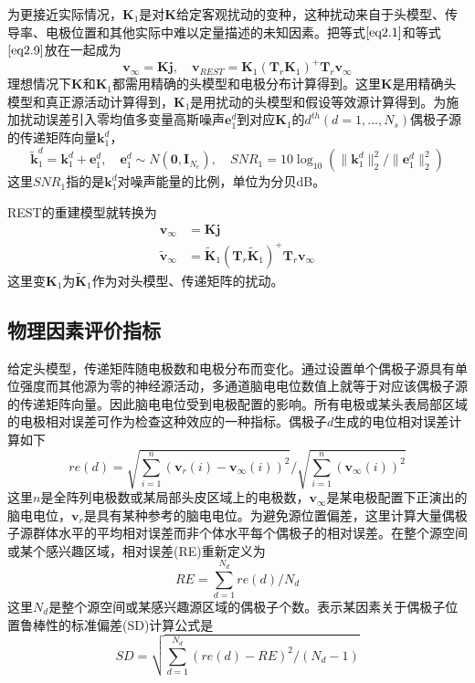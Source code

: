 为更接近实际情况，$\mathbf{K}_1$是对$\mathbf{K}$给定客观扰动的变种，这种扰动来自于头模型、传导率、电极位置和其他实际中难以定量描述的未知因素。把等式$\eqref{eq2.1}$和等式$\eqref{eq2.9}$放在一起成为
\begin{equation*}
\mathbf{v}_{\infty}=\mathbf{Kj},\quad\mathbf{v}_{REST}=\mathbf{K}_1(\mathbf{T}_r\mathbf{K}_1)^{+}\mathbf{T}_{r}\mathbf{v}_{\infty}
\end{equation*}
理想情况下$\mathbf{K}$和$\mathbf{K}_1$都需用精确的头模型和电极分布计算得到。这里$\mathbf{K}$是用精确头模型和真正源活动计算得到，$\mathbf{K}_1$是用扰动的头模型和假设等效源计算得到。为施加扰动误差引入零均值多变量高斯噪声$\mathbf{e}_1^d$到对应$\mathbf{K}_1$的$d^{th}(d=1,...,N_s)$偶极子源的传递矩阵向量$\mathbf{k}_1^d$，
\begin{equation*}
\tilde{\mathbf{k}}_1^d=\mathbf{k}_1^d+\mathbf{e}_1^d,\quad\mathbf{e}_1^d\sim{N(\mathbf{0},\mathbf{I}_{N_e})},\quad{SNR}_1 =10\log_{10}(\lVert\mathbf{k}_1^d\rVert_2^2/{\lVert\mathbf{e}_1^d\rVert_2^2})
\end{equation*}
这里$SNR_1$指的是$\mathbf{k}_1^d$对噪声能量的比例，单位为分贝dB。

REST的重建模型就转换为
\begin{equation}\label{eq2.10}
\begin{aligned}
\mathbf{v}_{\infty}& =\mathbf{Kj}\\
\tilde{\mathbf{v}}_{\infty}& =\tilde{\mathbf{K}}_1(\mathbf{T}_{r}\tilde{\mathbf{K}}_1)^+\mathbf{T}_r\mathbf{v}_{\infty}
\end{aligned}
\end{equation}
这里变$\mathbf{K}_1$为$\tilde{\mathbf{K}}_1$作为对头模型、传递矩阵的扰动。

\subsection{物理因素评价指标}
给定头模型，传递矩阵随电极数和电极分布而变化。通过设置单个偶极子源具有单位强度而其他源为零的神经源活动，多通道脑电电位数值上就等于对应该偶极子源的传递矩阵向量。因此脑电电位受到电极配置的影响。所有电极或某头表局部区域的电极相对误差可作为检查这种效应的一种指标。偶极子$d$生成的电位相对误差计算如下
\begin{equation*}
re(d)=\sqrt{\sum_{i=1}^n(\mathbf{v}_r(i)-\mathbf{v}_{\infty}(i))^2}/\sqrt{\sum_{i=1}^n(\mathbf{v}_{\infty}(i))^2}
\end{equation*}
这里$n$是全阵列电极数或某局部头皮区域上的电极数，$\mathbf{v}_{\infty}$是某电极配置下正演出的脑电电位，$\mathbf{v}_r$是具有某种参考的脑电电位。为避免源位置偏差，这里计算大量偶极子源群体水平的平均相对误差而非个体水平每个偶极子的相对误差。在整个源空间或某个感兴趣区域，相对误差(RE)重新定义为
\begin{equation*}
RE=\sum_{d=1}^{N_d}re(d)/{N_d}
\end{equation*}
这里$N_d$是整个源空间或某感兴趣源区域的偶极子个数。表示某因素关于偶极子位置鲁棒性的标准偏差(SD)计算公式是
\begin{equation*}
SD=\sqrt{\sum_{d=1}^{N_d}(re(d)-RE)^2/(N_d-1)}
\end{equation*}

